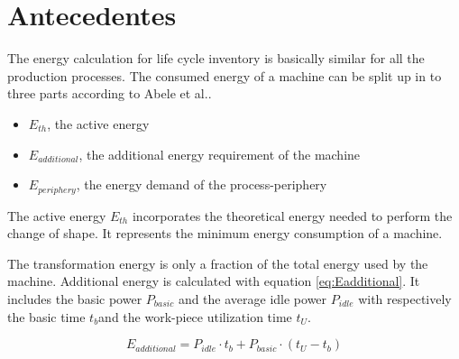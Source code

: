 \newpage
\section{Antecedentes}
\label{chapter2}
\textit{}

The energy calculation for life cycle inventory is basically similar for all the production processes. The consumed energy of a machine can be split up in to three parts according to Abele et al.\cite{Abele2005}.
\begin{itemize}  
\item $E_{th}$, the active energy 
\item $E_{additional}$, the additional energy requirement of the machine 
\item $E_{periphery}$, the energy demand of the process-periphery 
\end{itemize}

The active energy $E_{th}$ incorporates the theoretical energy needed to perform the change of shape. It represents the minimum energy consumption of a machine. 

The transformation energy is only a fraction of the total energy used by the machine. Additional energy is calculated with equation \ref{eq:Eadditional}. It includes the basic power $P_{basic}$ and the average idle power $P_{idle}$ with respectively the basic time $t_{b}$and the work-piece utilization time $t_{U}$.

\begin{equation} \label{eq:Eadditional}
E_{additional} = P_{idle} \cdot t_b + P_{basic} \cdot (t_{U} - t_{b})
\end{equation}

